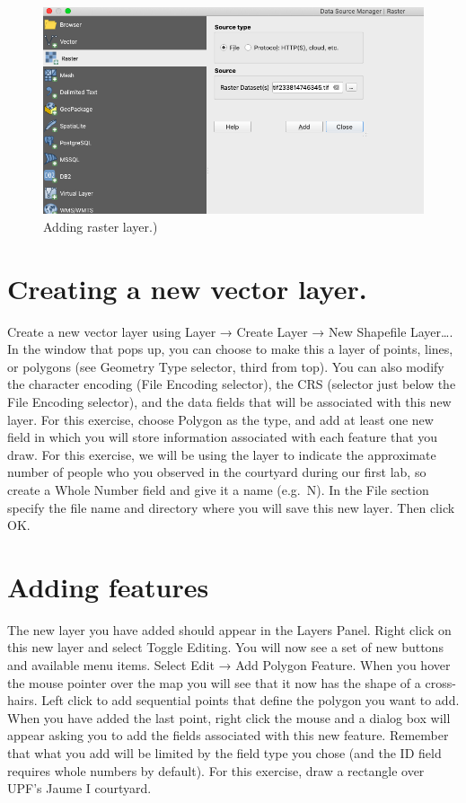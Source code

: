 \documentclass[]{book}
\begin{document}
\begin{figure}
\centering
\includegraphics{images/adding_raster_layer.png}
\caption{Adding raster layer.)}
\end{figure}

\hypertarget{creating-a-new-vector-layer.}{%
\section{Creating a new vector layer.}\label{creating-a-new-vector-layer.}}

Create a new vector layer using Layer → Create Layer → New Shapefile Layer\ldots{}. In the window that pops up, you can choose to make this a layer of points, lines, or polygons (see Geometry Type selector, third from top). You can also modify the character encoding (File Encoding selector), the CRS (selector just below the File Encoding selector), and the data fields that will be associated with this new layer.
For this exercise, choose Polygon as the type, and add at least one new field in which you will store information associated with each feature that you draw. For this exercise, we will be using the layer to indicate the approximate number of people who you observed in the courtyard during our first lab, so create a Whole Number field and give it a name (e.g.~N). In the File section specify the file name and directory where you will save this new layer. Then click OK.

\hypertarget{adding-features}{%
\section{Adding features}\label{adding-features}}

The new layer you have added should appear in the Layers Panel. Right click on this new layer and select Toggle Editing. You will now see a set of new buttons and available menu items. Select Edit → Add Polygon Feature. When you hover the mouse pointer over the map you will see that it now has the shape of a cross-hairs. Left click to add sequential points that define the polygon you want to add. When you have added the last point, right click the mouse and a dialog box will appear asking you to add the fields associated with this new feature. Remember that what you add will be limited by the field type you chose (and the ID field requires whole numbers by default). For this exercise, draw a rectangle over UPF's Jaume I courtyard.
\end{document}
